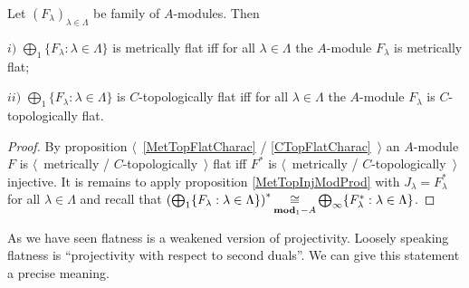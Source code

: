 \begin{proposition}\label{MetTopFlatModCoProd} Let $(F_\lambda)_{\lambda\in\Lambda}$ be family of $A$-modules. Then 

$i)$ $\bigoplus_1\{F_\lambda:\lambda\in\Lambda\}$ is metrically flat iff for all $\lambda\in\Lambda$ the $A$-module $F_\lambda$ is metrically flat;

$ii)$ $\bigoplus_1\{F_\lambda:\lambda\in\Lambda\}$ is $C$-topologically flat iff for all $\lambda\in\Lambda$ the $A$-module $F_\lambda$ is $C$-topologically flat.
\end{proposition}
\begin{proof} By proposition $\langle$~\ref{MetTopFlatCharac} / \ref{CTopFlatCharac}~$\rangle$ an $A$-module $F$ is $\langle$~metrically / $C$-topologically~$\rangle$ flat iff $F^*$ is $\langle$~metrically / $C$-topologically~$\rangle$ injective. It is remains to apply proposition \ref{MetTopInjModProd} with $J_\lambda=F_\lambda^*$ for all $\lambda\in\Lambda$ and recall that $\left(\bigoplus_1\{ F_\lambda:\lambda\in\Lambda\}\right)^*\mathop{\mathbin{\cong}}\limits_{\mathbf{mod}_1-A}\bigoplus_\infty\{ F_\lambda^*:\lambda\in\Lambda\}$.
\end{proof}

As we have seen flatness is a weakened version of projectivity. Loosely speaking flatness is ``projectivity with respect to second duals''. We can give this statement a precise meaning.

